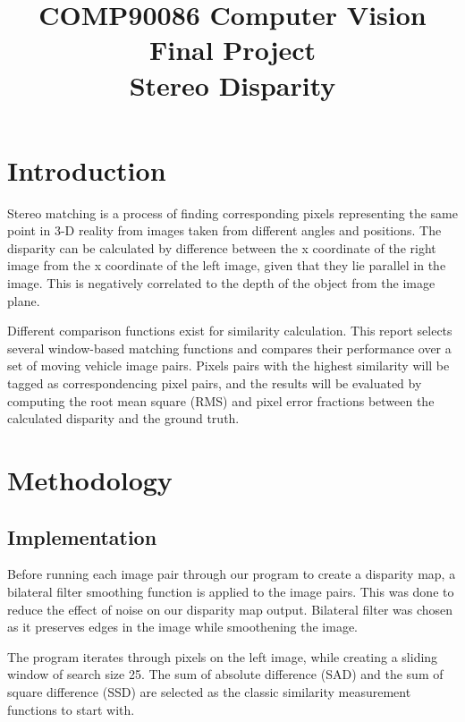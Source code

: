 \documentclass[conference]{IEEEtran}
\begin{document}
\title{COMP90086 Computer Vision Final Project\\
Stereo Disparity
}
\author{
\and
{}
}
\maketitle

\thispagestyle{plain}
\pagestyle{plain}

\section{Introduction}
Stereo matching is a process of finding corresponding pixels representing the same point in 3-D reality from images taken from different angles and positions. The disparity can be calculated by difference between the x coordinate of the right image from the x coordinate of the left image, given that they lie parallel in the image. This is negatively correlated to the depth of the object from the image plane.

Different comparison functions exist for similarity calculation. This report selects several window-based matching functions and compares their performance over a set of moving vehicle image pairs. Pixels pairs with the highest similarity will be tagged as correspondencing pixel pairs, and the results will be evaluated by computing the root mean square (RMS) and pixel error fractions between the calculated disparity and the ground truth.

\vspace{10pt}
\section{Methodology}
\subsection{Implementation}
Before running each image pair through our program to create a disparity map, a bilateral filter smoothing function is applied to the image pairs. This was done to reduce the effect of noise on our disparity map output. Bilateral filter was chosen as it preserves edges in the image while smoothening the image.

The program iterates through pixels on the left image, while creating a sliding window of search size 25. The sum of absolute difference (SAD) and the sum of square difference (SSD) are selected as the classic similarity measurement functions to start with.
\end{document}
